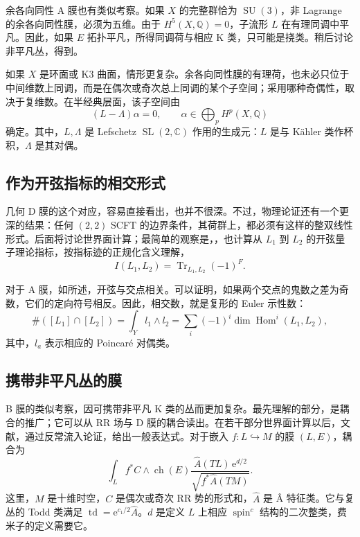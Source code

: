 余各向同性 A 膜也有类似考察。如果 $X$ 的完整群恰为 $\operatorname{SU}(3)$，非 Lagrange 的余各向同性膜，必须为五维。由于 $H^5(X,\mathbb{Q})=0$，子流形 $L$ 在有理同调中平凡。因此，如果 $E$ 拓扑平凡，所得同调荷与相应 K 类，只可能是挠类。稍后讨论非平凡丛，得到。

如果 $X$ 是环面或 K3 曲面，情形更复杂。余各向同性膜的有理荷，也未必只位于中间维数上同调，而是在偶次或奇次总上同调的某个子空间；采用哪种奇偶性，取决于复维数。在半经典层面，该子空间由
\[
(L-\Lambda)\alpha=0,\qquad\alpha\in\bigoplus_pH^p(X,\mathbb{Q})
\]
确定。其中，$L,\Lambda$ 是 Lefschetz $\operatorname{SL}(2,\mathbb{C})$ 作用的生成元：$L$ 是与 K\"ahler 类作杯积，$\Lambda$ 是其对偶。

\subsection{作为开弦指标的相交形式}\label{sec:5.1.3}

几何 D 膜的这个对应，容易直接看出，也并不很深。不过，物理论证还有一个更深的结果：任何 $(2,2)$ SCFT 的边界条件，其荷群上，都必须有这样的整双线性形式。后面将讨论世界面计算；最简单的观察是，，也计算从 $L_1$ 到 $L_2$ 的开弦量子理论指标，按指标迹的正规化含义理解，
\begin{equation}\label{eq:5.6}
I(L_1,L_2)=\operatorname{Tr}_{L_1,L_2}(-1)^F.
\end{equation}

对于 A 膜，如所述，开弦与交点相关。可以证明，如果两个交点的鬼数之差为奇数，它们的定向符号相反。因此，相交数，就是复形的 Euler 示性数：
\begin{equation}\label{eq:5.7}
\#([L_1]\cap[L_2])
=\int_Yl_1\wedge l_2
=\sum_i(-1)^i\dim\operatorname{Hom}^i(L_1,L_2),
\end{equation}
其中，$l_a$ 表示相应的 Poincar\'e 对偶类。

\subsection{携带非平凡丛的膜}\label{sec:5.1.4}

B 膜的类似考察，因可携带非平凡 K 类的丛而更加复杂。最先理解的部分，是耦合的推广；它可以从 RR 场与 D 膜的耦合读出。在若干部分世界面计算以后，文献，通过反常流入论证，给出一般表达式。对于嵌入 $f\colon L\hookrightarrow M$ 的膜 $(L,E)$，耦合为
\begin{equation}\label{eq:5.8}
\int_Lf^*C\wedge\operatorname{ch}(E)
\frac{\widehat A(TL)\,\mathrm{e}^{d/2}}
{\sqrt{f^*\widehat A(TM)}}.
\end{equation}
这里，$M$ 是十维时空，$C$ 是偶次或奇次 RR 势的形式和，$\widehat A$ 是 Â 特征类。它与复丛的 Todd 类满足 $\operatorname{td}=\mathrm{e}^{c_1/2}\widehat A$。$d$ 是定义 $L$ 上相应 $\operatorname{spin}^c$ 结构的二次整类，费米子的定义需要它。

